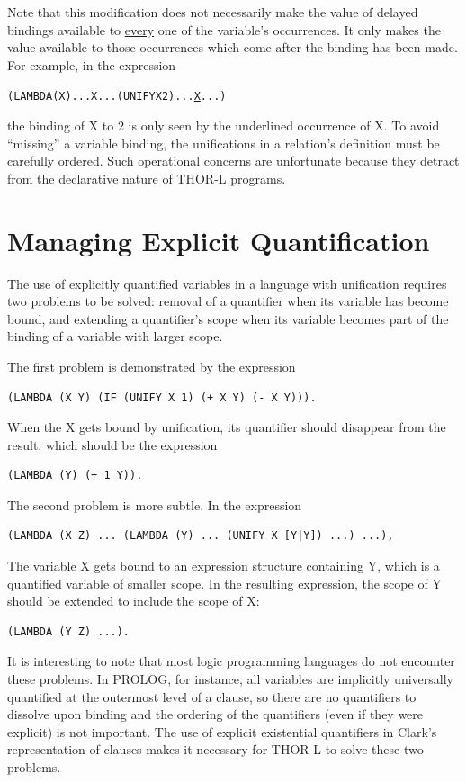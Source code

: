Note that this modification does not necessarily make the value of delayed
bindings available to \underline{every} one of the variable's occurrences. It only makes the
value available to those occurrences which come after the binding has been made.
For example, in the expression
\begin{alltt}
(LAMBDA (X) ... X ... (UNIFY X 2) ... \underline{X} ...)
\end{alltt}
the binding of X to 2 is only seen by the underlined occurrence of X. To avoid
``missing'' a variable binding, the unifications in a relation's definition must
be carefully ordered. Such operational concerns are unfortunate because they
detract from the declarative nature of THOR-L programs.

\section{Managing Explicit Quantification}

The use of explicitly quantified variables in a language with unification
requires two problems to be solved: removal of a quantifier when its variable
has become bound, and extending a quantifier's scope when its variable becomes
part of the binding of a variable with larger scope.

The first problem is demonstrated by the expression
\begin{verbatim}
(LAMBDA (X Y) (IF (UNIFY X 1) (+ X Y) (- X Y))).
\end{verbatim}
When the X gets bound by unification, its quantifier should disappear from the
result, which should be the expression
\begin{verbatim}
(LAMBDA (Y) (+ 1 Y)).
\end{verbatim}
The second problem is more subtle. In the expression
\begin{verbatim}
(LAMBDA (X Z) ... (LAMBDA (Y) ... (UNIFY X [Y|Y]) ...) ...),
\end{verbatim}
The variable X gets bound to an expression structure containing Y, which is a
quantified variable of smaller scope. In the resulting expression, the scope of
Y should be extended to include the scope of X:
\begin{verbatim}
(LAMBDA (Y Z) ...).
\end{verbatim}

It is interesting to note that most logic programming languages do not encounter
these problems. In PROLOG, for instance, all variables are implicitly
universally quantified at the outermost level of a clause, so there are no
quantifiers to dissolve upon binding and the ordering of the quantifiers (even
if they were explicit) is not important. The use of explicit existential
quantifiers in Clark's representation of clauses makes it necessary for THOR-L
to solve these two problems.

